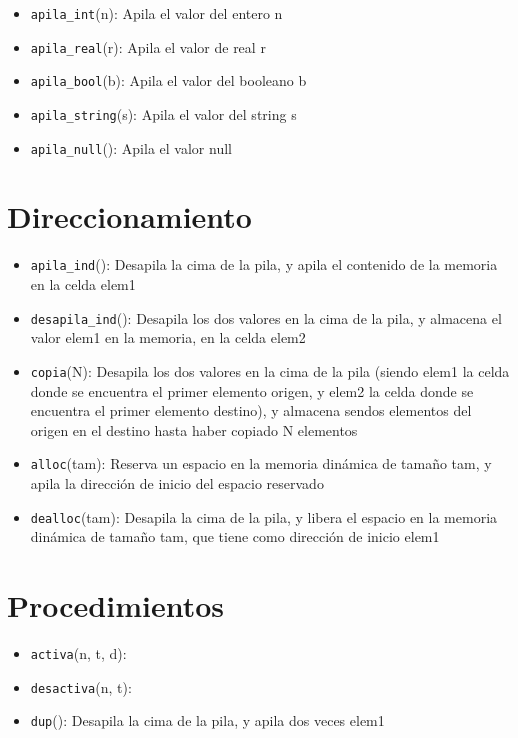 \begin{itemize}
    \item \texttt{apila\_int}(n): Apila el valor del entero n
    \item \texttt{apila\_real}(r): Apila el valor de real r
    \item \texttt{apila\_bool}(b): Apila el valor del booleano b
    \item \texttt{apila\_string}(s): Apila el valor del string s
    \item \texttt{apila\_null}(): Apila el valor null
\end{itemize}

\section{Direccionamiento}

\begin{itemize}
    \item \texttt{apila\_ind}(): Desapila la cima de la pila, y apila el contenido de la memoria en la celda elem1
    \item \texttt{desapila\_ind}(): Desapila los dos valores en la cima de la pila, y almacena el valor elem1 en la memoria, en la celda elem2
    \item \texttt{copia}(N): Desapila los dos valores en la cima de la pila (siendo elem1 la celda donde se encuentra el primer elemento origen, y elem2 la celda donde se encuentra el primer elemento destino), y almacena sendos elementos del origen en el destino hasta haber copiado N elementos
    \item \texttt{alloc}(tam): Reserva un espacio en la memoria dinámica de tamaño tam, y apila la dirección de inicio del espacio reservado
    \item \texttt{dealloc}(tam): Desapila la cima de la pila, y libera el espacio en la memoria dinámica de tamaño tam, que tiene como dirección de inicio elem1
\end{itemize}

\section{Procedimientos}

\begin{itemize}
    \item \texttt{activa}(n, t, d): 
    \item \texttt{desactiva}(n, t):
    \item \texttt{dup}(): Desapila la cima de la pila, y apila dos veces elem1
\end{itemize}

